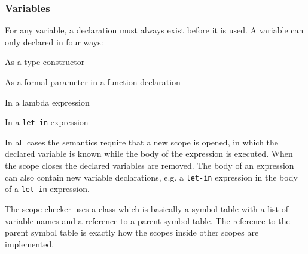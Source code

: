 

\subsubsection{Variables}
For any variable, a declaration must always exist before it is used. A variable
can only declared in four ways:

\begin{dlist}
  \item As a type constructor
  \item As a formal parameter in a function declaration
  \item In a lambda expression
  \item In a \texttt{let-in} expression
\end{dlist}

In all cases the \productname{} semantics require that a new scope is opened, in
which the declared variable is known while the body of the expression is
executed. When the scope closes the declared variables are removed. The body of
an expression can also contain new variable declarations, e.g. a \texttt{let-in}
expression in the body of a \texttt{let-in} expression. 

The scope checker uses a  class which is basically a
symbol table with a list of variable names and a reference to a parent symbol
table.  The reference to the parent symbol table is exactly how the scopes
inside other scopes are implemented. 

